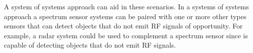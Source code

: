 \documentclass[journal,transmag]{IEEEtran}
\begin{document}
A system of systems approach can aid in these scenarios. In a systems of systems approach a spectrum sensor systems can be paired with one or more other types sensors that can detect objects that do not emit RF signals of opportunity. For example, a radar system could be used to complement a spectrum sensor since is capable of detecting objects that do not emit RF signals.


%
%



%
%
\end{document}
